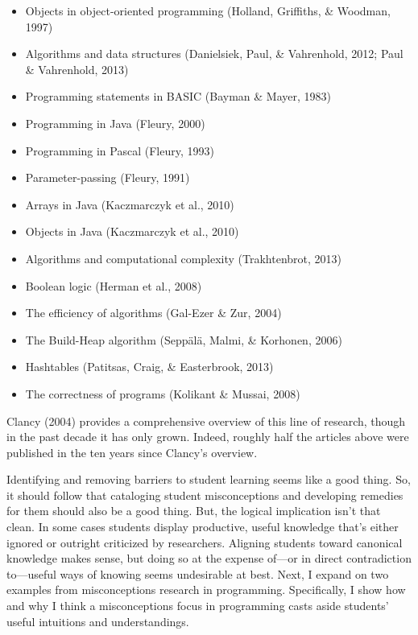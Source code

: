 \begin{itemize}
\item
  Objects in object-oriented programming (Holland, Griffiths, \&
  Woodman, 1997)
\item
  Algorithms and data structures (Danielsiek, Paul, \& Vahrenhold, 2012;
  Paul \& Vahrenhold, 2013)
\item
  Programming statements in BASIC (Bayman \& Mayer, 1983)
\item
  Programming in Java (Fleury, 2000)
\item
  Programming in Pascal (Fleury, 1993)
\item
  Parameter-passing (Fleury, 1991)
\item
  Arrays in Java (Kaczmarczyk et al., 2010)
\item
  Objects in Java (Kaczmarczyk et al., 2010)
\item
  Algorithms and computational complexity (Trakhtenbrot, 2013)
\item
  Boolean logic (Herman et al., 2008)
\item
  The efficiency of algorithms (Gal-Ezer \& Zur, 2004)
\item
  The Build-Heap algorithm (Seppälä, Malmi, \& Korhonen, 2006)
\item
  Hashtables (Patitsas, Craig, \& Easterbrook, 2013)
\item
  The correctness of programs (Kolikant \& Mussai, 2008)
\end{itemize}

Clancy (2004) provides a comprehensive overview of this line of
research, though in the past decade it has only grown. Indeed, roughly
half the articles above were published in the ten years since Clancy's
overview.

Identifying and removing barriers to student learning seems like a good
thing. So, it should follow that cataloging student misconceptions and
developing remedies for them should also be a good thing. But, the
logical implication isn't that clean. In some cases students display
productive, useful knowledge that's either ignored or outright
criticized by researchers. Aligning students toward canonical knowledge
makes sense, but doing so at the expense of---or in direct contradiction
to---useful ways of knowing seems undesirable at best. Next, I expand on
two examples from misconceptions research in programming. Specifically,
I show how and why I think a misconceptions focus in programming casts
aside students' useful intuitions and understandings.

